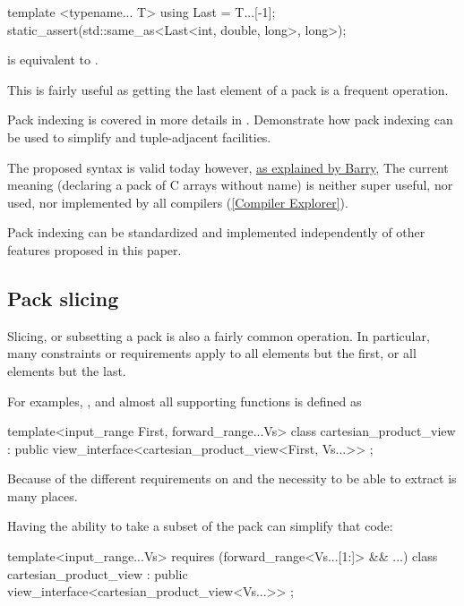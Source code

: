 \documentclass{wg21}
\begin{document}
\begin{colorblock}
template <typename... T>
using Last = T...[-1];
static_assert(std::same_as<Last<int, double, long>, long>);
\end{colorblock}

 is equivalent to .


This is fairly useful as getting the last element of a pack is a frequent operation.


Pack indexing is covered in more details in .  Demonstrate how pack indexing can be used to simplify
 and tuple-adjacent facilities.

The proposed syntax is valid today however, \href{https://www.open-std.org/jtc1/sc22/wg21/docs/papers/2020/p1858r2.html#pack-indexing-ambiguity}{as explained by Barry},
The current meaning (declaring a pack of C arrays without name) is neither super useful, nor used, nor implemented by all compilers (\href{https://godbolt.org/z/6obhffPTP}{[Compiler Explorer]}).

Pack indexing can be standardized and implemented independently of other features proposed in this paper.

\subsection{Pack slicing}

Slicing, or subsetting a pack is also a fairly common operation.
In particular, many constraints or requirements apply to all elements but the first, or all elements but the last.

For examples, , and almost all supporting functions is defined as

\begin{colorblock}
template<input_range First, forward_range...Vs>
class cartesian_product_view : public view_interface<cartesian_product_view<First, Vs...>> {};
\end{colorblock}

Because of the different requirements on  and the necessity to be able to extract 
is many places.

Having the ability to take a subset of the pack can simplify that code:

\begin{colorblock}
template<input_range...Vs>
requires (forward_range<Vs...[1:]> && ...)
class cartesian_product_view : public view_interface<cartesian_product_view<Vs...>> {};
\end{colorblock}
\end{document}
